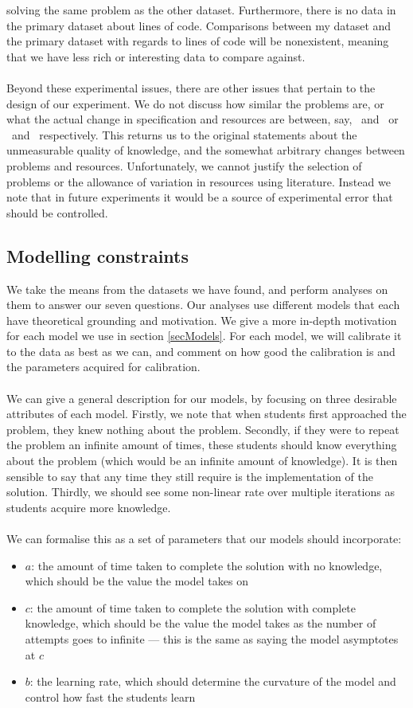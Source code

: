solving the same problem as the other dataset.
Furthermore, there is no data in the primary dataset about lines of code.
Comparisons between my dataset and the primary dataset with regards to lines of
code will be nonexistent, meaning that we have less rich or interesting data to
compare against.\\
\\
Beyond these experimental issues, there are other issues that pertain to
the design of our experiment.
We do not discuss how similar the problems are, or what the actual change in
specification and resources are between, say, \PO\ and \PT\ or \LA\ and \LB\ 
respectively.
This returns us to the original statements about the unmeasurable quality of
knowledge, and the somewhat arbitrary changes between problems and resources.
Unfortunately, we cannot justify the selection of problems or the allowance of
variation in resources using literature.
Instead we note that in future experiments it would be a source of experimental
error that should be controlled.

\subsection{Modelling constraints} \label{subsecModelling}

We take the means from the datasets we have found, and perform analyses on them
to answer our seven questions.
Our analyses use different models that each have theoretical grounding and
motivation.
We give a more in-depth motivation for each model we use in section
\ref{secModels}.
For each model, we will calibrate it to the data as best as we can, and comment
on how good the calibration is and the parameters acquired for calibration.\\
\\
We can give a general description for our models, by focusing on
three desirable attributes of each model.
Firstly, we note that when students first approached the problem, they knew
nothing about the problem.
Secondly, if they were to repeat the problem an infinite amount of times, these students
should know everything about the problem (which would be an infinite amount of
knowledge).
It is then sensible to say that any time they still require is the
implementation of the solution.
Thirdly, we should see some non-linear rate over multiple iterations as students acquire
more knowledge.\\
\\
We can formalise this as a set of parameters that our models should incorporate:
\begin{itemize}
  \item $a$: the amount of time taken to complete the solution with no knowledge,
  which should be the value the model takes on \AZ
  \item $c$: the amount of time taken to complete the solution with complete
  knowledge, which should be the value the model takes as the number of attempts
  goes to infinite --- this is the same as saying the model asymptotes at $c$
  \item $b$: the learning rate, which should determine the curvature of the
  model and control how fast the students learn
\end{itemize}

